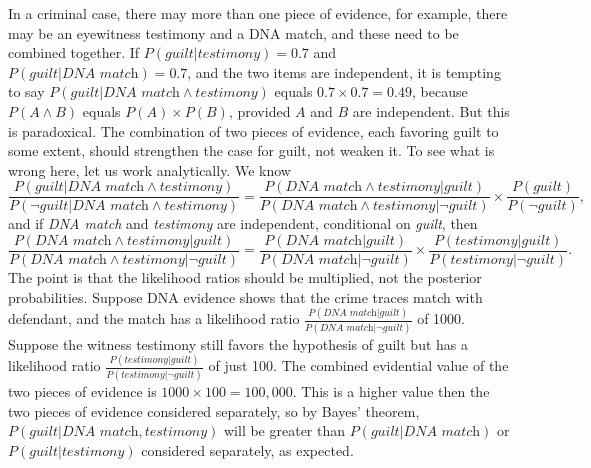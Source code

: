 \documentclass[10pt]{article}
\begin{document}
In a criminal case, there may more than one piece of evidence, for example, 
there may be an eyewitness testimony and a DNA match, and these need to be combined together. 
If $P(\textit{guilt}| \textit{testimony})=0.7$
and $P(\textit{guilt} | \textit{DNA match})=0.7$, and the two items are independent, 
it is tempting to say $P(\textit{guilt}| \textit{DNA match} \wedge \textit{testimony})$ equals 
$0.7\times 0.7=0.49$, because $P(A\wedge B)$ equals $P(A)\times P(B)$, provided 
$A$ and $B$ are independent. 
But this is paradoxical. 
The combination of two pieces of evidence, each favoring guilt to some extent, should strengthen the case for guilt, 
not weaken it. To see what is wrong here, 
let us work analytically.  We know 
\[\frac{P(\textit{guilt} | \textit{DNA match}\wedge \textit{testimony})}{P(\neg \textit{guilt} | \textit{DNA match}\wedge \textit{testimony})}=\frac{P(\textit{DNA match}\wedge \textit{testimony} | \textit{guilt})}{P(\textit{DNA match}\wedge \textit{testimony} | \neg \textit{guilt})}\times \frac{P(\textit{guilt})}{P(\neg \textit{guilt})},\]
 and if \textit{DNA match} and \textit{testimony} are independent, conditional on \textit{guilt}, then 
\[\frac{P(\textit{DNA match}\wedge \textit{testimony} | \textit{guilt})}{P(\textit{DNA match}\wedge \textit{testimony} | \neg \textit{guilt})}=\frac{P(\textit{DNA match}| \textit{guilt})}{P(\textit{DNA match}|\neg \textit{guilt})}\times\frac{P(\textit{testimony} | \textit{guilt})}{P(\textit{testimony} | \neg \textit{guilt})}.\]
%
%
%
The point is that the likelihood ratios should be multiplied, not the posterior probabilities. 
Suppose DNA evidence shows that the crime traces match with defendant, and 
the match has a likelihood ratio $\frac{P(\textit{DNA match} | \textit{guilt})}{P(\textit{DNA match}| \neg \textit{guilt})}$ of 1000. 
Suppose the witness testimony still favors the hypothesis of guilt but has a likelihood ratio $\frac{P(\textit{testimony} | \textit{guilt})}{P(\textit{testimony}| \neg \textit{guilt})}$ of just 100. 
The combined evidential value of the two pieces of evidence is $1000\times 100=100,000$. This is a higher value then 
the two pieces of evidence considered separately, so by Bayes' theorem, 
$P(\textit{guilt}| \textit{DNA match}, \textit{testimony})$ 
will be greater than $P(\textit{guilt}| \textit{DNA match})$ 
or $P(\textit{guilt}| \textit{testimony})$ considered separately, as expected. 
 
\end{document}
